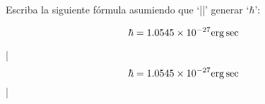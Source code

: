 

\bigskip

\enunciadoS Escriba la siguiente f\'ormula asumiendo que `|\hbar|' generar `$\hbar$':

$$\rm\hbar=1.0545\times10^{-27}erg\,sec$$

\respuestaS

|$$\rm\hbar=1.0545\times10^{-27}erg\,sec$$|

\bye

